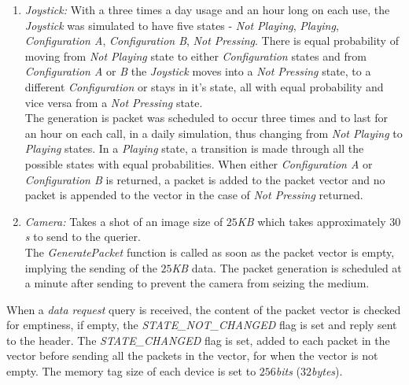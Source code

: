 \begin{enumerate}
{    configurations} and when in any of the \textit{Configurations} there is an equal
    probability of moving to a \textit{Not Pressing} state or staying in the same
    state but no chance of going to another \textit{Configuration} without first having
    to go through a \textit{Not Pressing} state. Having same chance of moving to any
    of other states from the \textit{Not Pressing} state. It is used 10 times a day and
    lasts for approximately \textit{$8s$} per use.\\
    The \textit{TV remote} class is programmed to fill up the packet vector 10 times
    in a day of simulation. The generation of the packets lasts for \textit{$8s$}. During
    this time which the \textit{GeneratePacket} function is called, the various states
    changes are simulated using Markov. When a \textit{Not Pressing} state is returned,
    no packet is added to the vector but for the other two states, packets are added to
    the vector.
\item \textit{Joystick:} With a three times a day usage and an hour long on each use,
    the \textit{Joystick} was simulated to have five states - \textit{Not Playing},
    \textit{Playing}, \textit{Configuration A}, \textit{Configuration B},\textit{
    Not Pressing}. There is equal probability of moving from \textit{Not Playing} state
    to either \textit{Configuration} states and from \textit{Configuration A} or
    \textit{B}
    the \textit{Joystick} moves into a \textit{Not Pressing} state, to a different
    \textit{Configuration} or stays in it's state, all with equal probability and vice
    versa from a \textit{Not Pressing} state.\\
    The generation is packet was scheduled to occur three times and to last for an hour
    on each call, in a daily simulation, thus changing from \textit{Not Playing} to
    \textit{Playing} states. In a \textit{Playing} state, a transition is made through
    all the possible states with equal probabilities. When either \textit{Configuration A}
    or \textit{Configuration B} is returned, a packet is added to the packet vector and
    no packet is appended to the vector in the case of \textit{Not Pressing} returned.
\item \textit{Camera:} Takes a shot of an image size of \textit{$25$KB} which takes
    approximately \textit{$30$s} to send to the querier.\\
    The \textit{GeneratePacket} function is called as soon as the packet vector is empty,
    implying the sending of the \textit{$25$KB} data. The packet generation is scheduled
    at a minute after sending to prevent the camera from seizing the medium.
\end{enumerate}
When a \textit{data request} query is received, the content of the packet vector is checked
for emptiness, if empty, the \textit{STATE\_NOT\_CHANGED} flag is set and reply sent to
the header. The \textit{STATE\_CHANGED} flag is set, added to each packet in the vector
before sending all the packets in the vector, for when the vector is not empty.
The memory tag size of each device is set to $256$\textit{bits} ($32$\textit{bytes}).

